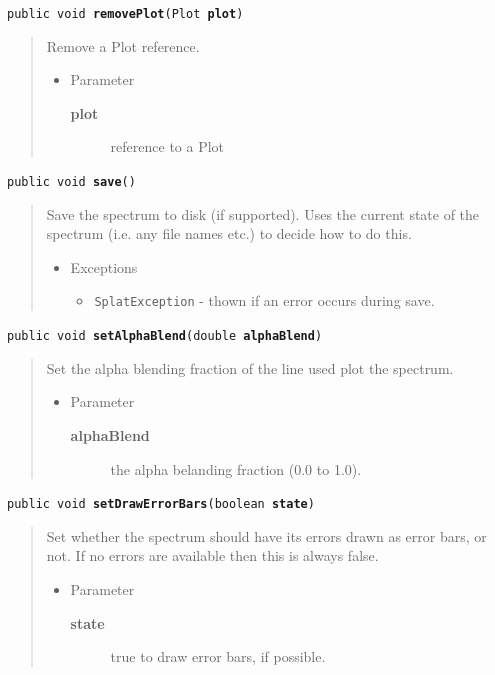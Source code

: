 \documentclass[twoside,11pt]{article}
\renewcommand{\_}{\texttt{\symbol{95}}}
\newcommand{\method}[1]{\texttt{#1}}
\newenvironment{desc}{\begin{quote}}{\end{quote}}
\begin{document}
\method{public void \textbf{removePlot}(\texttt{Plot} \textbf{plot})\label{l93}\label{l94}}
\begin{desc}Remove a Plot reference.
\begin{itemize}
\item{Parameter
  \begin{description}
   \item[\textbf{plot}]{reference to a Plot}
  \end{description}}
\end{itemize}
\end{desc}

\method{public void \textbf{save}()\label{l95}\label{l96}}
\begin{desc}Save the spectrum to disk (if supported). Uses the current
 state of the spectrum (i.e. any file names etc.) to decide how
 to do this.
\begin{itemize}
\item{{Exceptions}
  \begin{itemize}
   \item{\vspace{-.6ex}\texttt{SplatException} - thown if an error occurs during save.}
  \end{itemize}
}
\end{itemize}
\end{desc}

\method{public void \textbf{setAlphaBlend}(\texttt{double} \textbf{alphaBlend})\label{l97}\label{l98}}
\begin{desc}Set the alpha blending fraction of the line used plot the spectrum.
\begin{itemize}
\item{Parameter
  \begin{description}
   \item[\textbf{alphaBlend}]{the alpha belanding fraction (0.0 to 1.0).}
  \end{description}}
\end{itemize}
\end{desc}

\method{public void \textbf{setDrawErrorBars}(\texttt{boolean} \textbf{state})\label{l99}\label{l100}}
\begin{desc}Set whether the spectrum should have its errors drawn as error
 bars, or not. If no errors are available then this is always
 false.
\begin{itemize}
\item{Parameter
  \begin{description}
   \item[\textbf{state}]{true to draw error bars, if possible.}
  \end{description}}
\end{itemize}
\end{desc}
\end{document}
